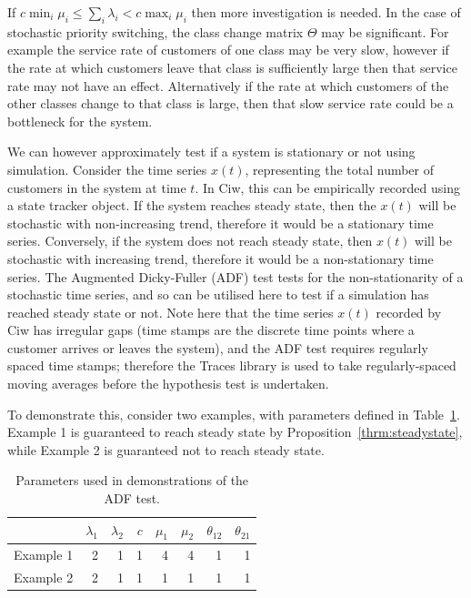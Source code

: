 \documentclass{article}
\begin{document}
If $c \min_i \mu_i \leq \sum_i \lambda_i < c \max_i \mu_i$ then more
investigation is needed. In the case of stochastic priority switching, the class
change matrix $\Theta$ may be significant. For example the service rate of
customers of one class may be very slow, however if the rate at which customers
leave that class is sufficiently large then that service rate may not have an
effect. Alternatively if the rate at which customers of the other classes change
to that class is large, then that slow service rate could be a bottleneck for
the system.

We can however approximately test if a system is stationary or not using
simulation. Consider the time series $x(t)$, representing the total number of
customers in the system at time $t$. In Ciw, this can be empirically recorded
using a state tracker object. If the system reaches steady state, then the
$x(t)$ will be stochastic with non-increasing trend, therefore it would be a
stationary time series. Conversely, if the system does not reach steady state,
then $x(t)$ will be stochastic with increasing trend, therefore it would be a
non-stationary time series.
The Augmented Dicky-Fuller (ADF) test \cite{dickyfuller79} tests for the
non-stationarity of a stochastic time series, and so can be utilised here to
test if a simulation has reached steady state or not. Note here that the time
series $x(t)$ recorded by Ciw has irregular gaps (time stamps are the discrete
time points where a customer arrives or leaves the system), and the ADF test
requires regularly spaced time stamps; therefore the Traces library
\cite{traces} is used to take regularly-spaced moving averages before the
hypothesis test is undertaken.

To demonstrate this, consider two examples, with parameters defined in
Table~\ref{tbl:adf_example_parameters}. Example 1 is guaranteed to reach steady
state by Proposition~\ref{thrm:steadystate}, while Example 2 is guaranteed not
to reach steady state.

\begin{table}
\begin{center}
\begin{tabular}{rrrrrrrr}
\toprule
 & $\lambda_1$ & $\lambda_2$ & $c$ & $\mu_1$ & $\mu_2$ & $\theta_{12}$ & $\theta_{21}$ \\
\midrule
Example 1 & 2 & 1 & 1 & 4 & 4 & 1 & 1\\ 
Example 2 & 2 & 1 & 1 & 1 & 1 & 1 & 1\\ 
\bottomrule
\end{tabular}
\end{center}
\caption{Parameters used in demonstrations of the ADF test.}
\label{tbl:adf_example_parameters}
\end{table}
\end{document}
